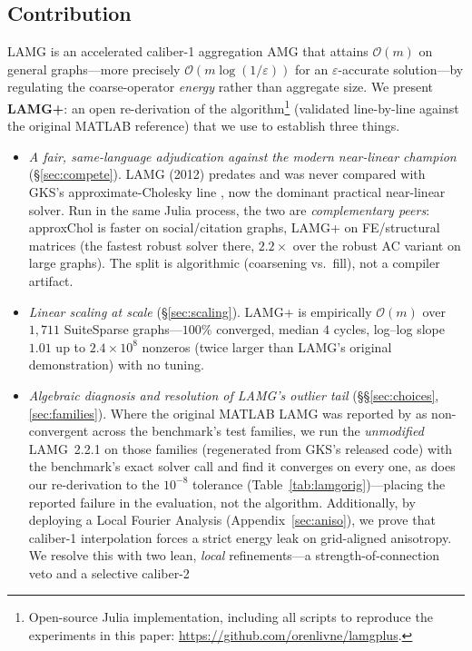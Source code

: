 \documentclass{siamart220329}
\newcommand{\Om}{\mathcal{O}(m)}
\begin{document}
\subsection{Contribution}\label{sec:contrib}
LAMG \cite{lamg} is an accelerated caliber-1 aggregation AMG that attains $\Om$ on general
graphs---more precisely $\mathcal{O}(m\log(1/\varepsilon))$ for an $\varepsilon$-accurate
solution---by regulating the coarse-operator \emph{energy} rather than aggregate size. We present
\textbf{LAMG+}: an open re-derivation of the algorithm\footnote{Open-source Julia implementation,
including all scripts to reproduce the experiments in this paper: \url{https://github.com/orenlivne/lamgplus}.}
(validated line-by-line against the
original MATLAB reference) that we use to establish three things.
\begin{itemize}[leftmargin=1.4em,itemsep=1pt]
\item \emph{A fair, same-language adjudication against the modern near-linear champion}
(\S\ref{sec:compete}). LAMG (2012) predates and was never compared with GKS's approxi\-mate-Cholesky
line \cite{laplacians,gks2023}, now the dominant practical near-linear solver.
Run in the same Julia process, the two are \emph{complementary peers}: approxChol is
faster on social/citation graphs, LAMG+ on FE/structural matrices (the fastest robust solver there,
$2.2\times$ over the robust AC variant on large graphs). The split is algorithmic
(coarsening vs.\ fill), not a compiler artifact.
\item \emph{Linear scaling at scale} (\S\ref{sec:scaling}). LAMG+ is empirically $\Om$ over
$1{,}711$ SuiteSparse graphs---$100\%$ converged, median $4$ cycles, log--log slope $1.01$ up to $2.4\!\times\!10^8$ nonzeros (twice larger than LAMG's original demonstration) with no tuning.
\item \emph{Algebraic diagnosis and resolution of LAMG's outlier tail} (\S\S\ref{sec:choices},\,\ref{sec:families}).
Where the original MATLAB LAMG was reported by \cite{gks2023} as non-convergent across the benchmark's
test families, we run the \emph{unmodified} LAMG~2.2.1 on those families (regenerated from GKS's released code) with the benchmark's exact solver call and find it converges on every one, as does our
re-derivation to the $10^{-8}$ tolerance (Table~\ref{tab:lamgorig})---placing the reported failure
in the evaluation, not the algorithm.
Additionally, by deploying a Local Fourier Analysis (Appendix~\ref{sec:aniso}), we prove that caliber-1 interpolation forces a strict energy leak on grid-aligned anisotropy. We resolve this with two lean, \emph{local} refinements---a strength-of-connection veto and a selective caliber-2

\end{itemize}
\end{document}
